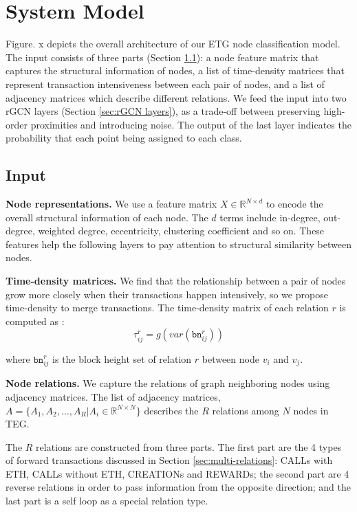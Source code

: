 
\section{System Model}
Figure. x depicts the overall architecture of our ETG node classification model. The input consists of three parts (Section \ref{sec:input}): a node feature matrix that captures the structural information of nodes, a list of time-density matrices that represent transaction intensiveness between each pair of nodes, and a list of adjacency matrices which describe different relations. We feed the input into two rGCN layers (Section \ref{sec:rGCN layers}), as a trade-off between preserving high-order proximities and introducing noise. The output of the last layer indicates the probability that each point being assigned to each class.

\subsection{Input}
\label{sec:input}
\textbf{Node representations.} We use a feature matrix $X \in \mathbb{R}^{N \times d}$ to encode the overall structural information of each node. The $d$ terms include in-degree, out-degree, weighted degree, eccentricity, clustering coefficient and so on. These features help the following layers to pay attention to structural similarity between nodes.

\textbf{Time-density matrices.} We find that the relationship between a pair of nodes grow more closely when their transactions happen intensively, so we propose time-density to merge transactions. The time-density matrix of each relation $r$ is computed as :%
\begin{equation}
\tau_{ij}^r=g(var(\texttt{bn}_{ij}^r))
\label{eq:time}
\end{equation}

where $\texttt{bn}_{ij}^{r}$ is the block height set of relation $r$ between node $v_i$ and $v_j$. 

\textbf{Node relations.} We capture the relations of graph neighboring nodes using adjacency matrices. The list of adjacency matrices, $A=\{A_1,A_2,...,A_R|A_i\in \mathbb{R}^{N \times N}\}$ describes the $R$ relations among $N$ nodes in TEG.

The $R$ relations are constructed from three parts. The first part are the 4 types of forward transactions discussed in Section \ref{sec:multi-relations}: CALLs with ETH, CALLs without ETH, CREATIONs and REWARDs; the second part are 4 reverse relations in order to pass information from the opposite direction; and the last part is a self loop as a special relation type.


